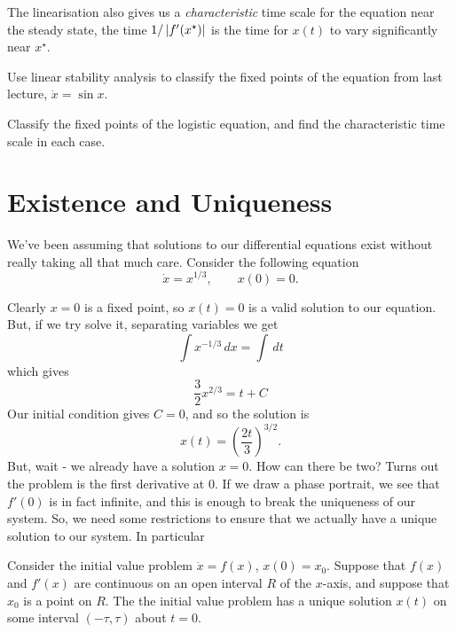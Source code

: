 The linearisation also gives us a \emph{characteristic} time scale for the
equation near the steady state, the time $1/\left\lvert f'(x^\star)\right\rvert$ is the time
for $x(t)$ to vary significantly near $x^\star$.

\begin{example} Use linear stability analysis to classify the fixed points
    of the equation from last lecture, $\dot x = \sin x$.
\end{example}

\begin{example} Classify the fixed points of the logistic equation, and
    find the characteristic time scale in each case.
\end{example}

\section{Existence and Uniqueness}
We've been assuming that solutions to our differential equations exist
without really taking all that much care. Consider the following equation
\begin{equation*}
    \dot x = x^{1/3}, \qquad x(0) = 0.
\end{equation*}

Clearly $x = 0$ is a fixed point, so $x(t) = 0$ is a valid solution to our
equation. But, if we try solve it, separating variables we get
\begin{equation*}
    \int x^{-1/3}\,dx = \int\,dt
\end{equation*}
which gives
\begin{equation*}
    \frac{3}{2} x^{2/3} = t + C
\end{equation*}
Our initial condition gives $C = 0$, and so the solution is
\begin{equation*}
    x(t) = \left(\frac{2t}{3} \right)^{3/2}.
\end{equation*}
But, wait - we already have a solution $x = 0$. How can there be two? Turns
out the problem is the first derivative at $0$. If we draw a phase
portrait, we see that $f'(0)$ is in fact infinite, and this is enough to
break the uniqueness of our system. So, we need some restrictions to ensure
that we actually have a unique solution to our system. In particular
\begin{existenceuniqueness}
    Consider the initial value problem $\dot{x} = f(x)$, $x(0) = x_0$.
    Suppose that $f(x)$ and $f'(x)$ are continuous on an open interval $R$
    of the $x$-axis, and suppose that $x_0$ is a point on $R$. The the
    initial value problem has a unique solution $x(t)$ on some interval
    $(-\tau, \tau)$ about $t = 0$.
\end{existenceuniqueness}



